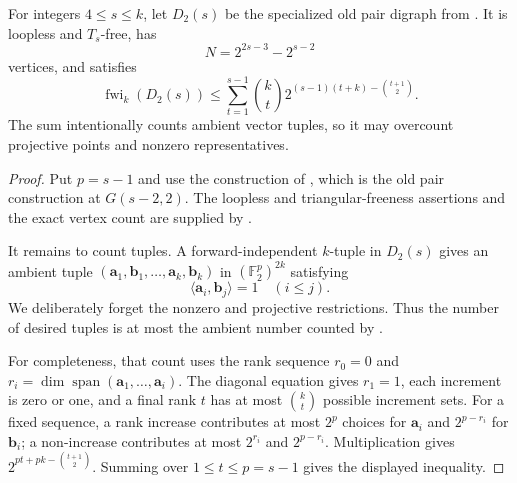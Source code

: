 \begin{lemma}
For integers $4\leq s\leq k$, let $D_2(s)$ be the specialized old pair
digraph from .  It is loopless and $T_s$-free, has
\[
N=2^{2s-3}-2^{s-2}
\]
vertices, and satisfies
\[
 \operatorname{fwi}_k(D_2(s))\leq
 \sum_{t=1}^{s-1}\binom kt
 2^{(s-1)(t+k)-\binom{t+1}{2}}.
\]
The sum intentionally counts ambient vector tuples, so it may overcount
projective points and nonzero representatives.
\end{lemma}
\begin{proof}
Put $p=s-1$ and use the construction of
, which is the old pair construction at
$G(s-2,2)$.  The loopless and triangular-freeness assertions and the exact
vertex count are supplied by .

It remains to count tuples.  A forward-independent $k$-tuple in $D_2(s)$
gives an ambient tuple
$(\mathbf a_1,\mathbf b_1,\ldots,\mathbf a_k,\mathbf b_k)$ in
$(\mathbb F_2^p)^{2k}$ satisfying
\[
 \langle\mathbf a_i,\mathbf b_j\rangle=1\quad(i\leq j).
\]
We deliberately forget the nonzero and projective restrictions.  Thus the
number of desired tuples is at most the ambient number counted by
.

For completeness, that count uses the rank sequence
$r_0=0$ and
$r_i=\dim\operatorname{span}(\mathbf a_1,\ldots,\mathbf a_i)$.  The
diagonal equation gives $r_1=1$, each increment is zero or one, and a final
rank $t$ has at most $\binom kt$ possible increment sets.  For a fixed
sequence, a rank increase contributes at most $2^p$ choices for
$\mathbf a_i$ and $2^{p-r_i}$ for $\mathbf b_i$; a non-increase contributes
at most $2^{r_i}$ and $2^{p-r_i}$.  Multiplication gives
$2^{pt+pk-\binom{t+1}{2}}$.  Summing over $1\leq t\leq p=s-1$ gives the
displayed inequality.
\end{proof}
